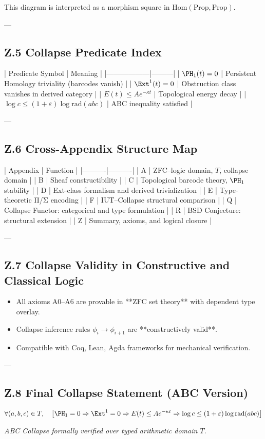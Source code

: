 \documentclass[11pt]{article}
\begin{document}
This diagram is interpreted as a morphism square in \( \mathrm{Hom}(\mathrm{Prop}, \mathrm{Prop}) \).

---

\subsection*{Z.5 Collapse Predicate Index}

| Predicate Symbol | Meaning |
|------------------|---------|
| \( \PH_1(t) = 0 \) | Persistent Homology triviality (barcodes vanish) |
| \( \Ext^1(t) = 0 \) | Obstruction class vanishes in derived category |
| \( E(t) \leq Ae^{-\kappa t} \) | Topological energy decay |
| \( \log c \leq (1+\varepsilon)\log \mathrm{rad}(abc) \) | ABC inequality satisfied |

---

\subsection*{Z.6 Cross-Appendix Structure Map}

| Appendix | Function |
|----------|----------|
| A | ZFC–logic domain, \( T \), collapse domain |
| B | Sheaf constructibility |
| C | Topological barcode theory, \( \PH_1 \) stability |
| D | Ext-class formalism and derived trivialization |
| E | Type-theoretic Π/Σ encoding |
| F | IUT–Collapse structural comparison |
| Q | Collapse Functor: categorical and type formulation |
| R | BSD Conjecture: structural extension |
| Z | Summary, axioms, and logical closure |

---

\subsection*{Z.7 Collapse Validity in Constructive and Classical Logic}

\begin{itemize}
  \item All axioms A0–A6 are provable in **ZFC set theory** with dependent type overlay.
  \item Collapse inference rules \( \phi_i \to \phi_{i+1} \) are **constructively valid**.
  \item Compatible with Coq, Lean, Agda frameworks for mechanical verification.
\end{itemize}

---

\subsection*{Z.8 Final Collapse Statement (ABC Version)}

\[
\forall (a,b,c) \in T,\quad
\left[
  \PH_1 = 0 \Rightarrow \Ext^1 = 0 \Rightarrow E(t) \leq Ae^{-\kappa t} \Rightarrow \log c \leq (1+\varepsilon)\log \mathrm{rad}(abc)
\right]
\]

\begin{center}
\textit{ABC Collapse formally verified over typed arithmetic domain \( T \).}
\end{center}
\end{document}
